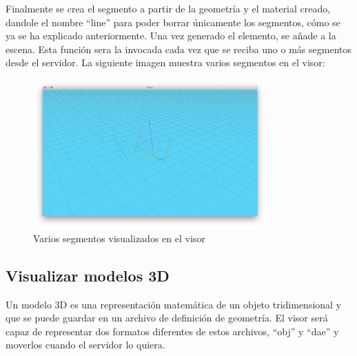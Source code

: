 Finalmente se crea el segmento a partir de la geometría y el material creado, dandole el nombre ``line'' para poder borrar únicamente los segmentos, cómo se ya se ha explicado anteriormente. Una vez generado el elemento, se añade a la escena. Esta función sera la invocada cada vez que se reciba uno o más segmentos desde el servidor. La siguiente imagen muestra varios segmentos en el visor:
\begin{figure}[H]
  \begin{center}
    \includegraphics[width=0.8\textwidth]{figures/visualizarlineas.png}
		\caption{Varios segmentos visualizados en el visor}
		\label{fig.visualizarsegmentos}
		\end{center}
\end{figure}

\subsection{Visualizar modelos 3D}
Un modelo 3D es una representación matemática de un objeto tridimensional y que se puede guardar en un archivo de definición de geometría. El visor será capaz de representar dos formatos diferentes de estos archivos, ``obj'' y ``dae'' y moverlos cuando el servidor lo quiera. 

